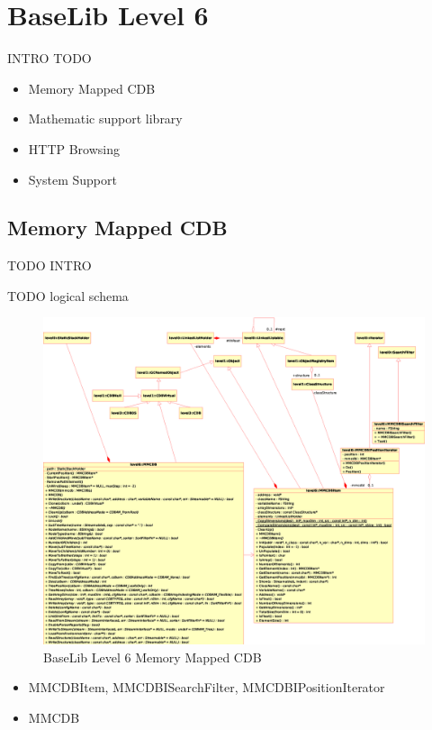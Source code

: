 \chapter{BaseLib Level 6}


INTRO TODO


\begin{itemize}
 \item Memory Mapped CDB
 \item Mathematic support library
 \item HTTP Browsing
 \item System Support
\end{itemize}




\section{Memory Mapped CDB}

TODO INTRO

TODO logical schema

\begin{figure}[h!]
 \begin{center}
  \includegraphics[width=1.1\textwidth]{level6/level6-MMCDB-exp.eps}
  \caption{BaseLib Level 6 Memory Mapped CDB}
  \label{f:level6:MMCDB}
 \end{center}
\end{figure}

\begin{itemize}
 \item MMCDBItem, MMCDBISearchFilter, MMCDBIPositionIterator
 \item MMCDB
\end{itemize}




